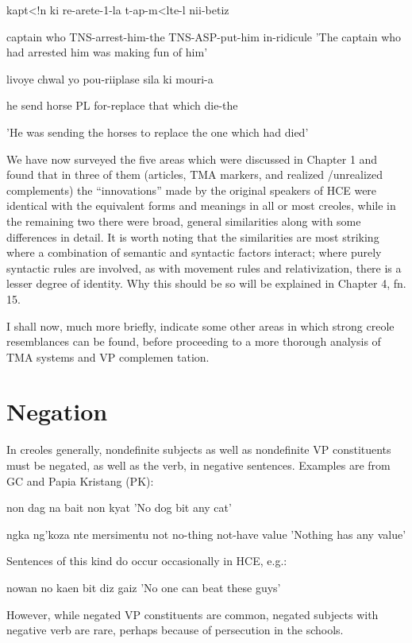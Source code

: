 \ea\label{ex:50}
 kapt{\textless}!n ki re-arete{}-1{}-la t-ap-m{\textless}lte-l nii-betiz
\glt
\z

captain who TNS-arrest-him-the TNS-ASP-put-him in-ridicule 'The captain who had arrested him was making fun of him'

\ea\label{ex:51}
 livoye chwal yo pou-riiplase sila ki mouri-a
\glt
\z

he send horse PL for-replace that which die-the

'He was sending the horses to replace the one which had died'

We have now surveyed the five areas which were discussed in Chapter 1 and found that in three of them (articles, TMA markers, and realized /unrealized complements) the ``innovations'' made by the original speakers of HCE were identical with the equivalent forms and meanings in all or most creoles, while in the remaining two there were broad, general similarities along with some differences in detail. It is worth noting that the similarities are most striking where a combi\-nation of semantic and syntactic factors interact; where purely syn\-tactic rules are involved, as with movement rules and relativization, there is a lesser degree of identity. Why this should be so will be explained in Chapter 4, fn. 15.

I shall now, much more briefly, indicate some other areas in which strong creole resemblances can be found, before proceeding to a more thorough analysis of TMA systems and VP complemen tation.

\section{Negation}


In creoles generally, nondefinite subjects as well as nondefinite VP constituents must be negated, as well as the verb, in negative sen\-tences. Examples are from GC and Papia Kristang (PK):


\ea\label{ex:52}
 non dag na bait non kyat 'No dog bit any cat'
\glt
\z

\ea\label{ex:53}
 ngka ng'koza nte mersimentu not no-thing not-have value 'Nothing has any value'
\glt
\z

Sentences of this kind do occur occasionally in HCE, e.g.:

\ea\label{ex:54}
 nowan no kaen bit diz gaiz 'No one can beat these guys'
\glt
\z

However, while negated VP constituents are common, negated subjects with negative verb are rare, perhaps because of persecution in the schools.

